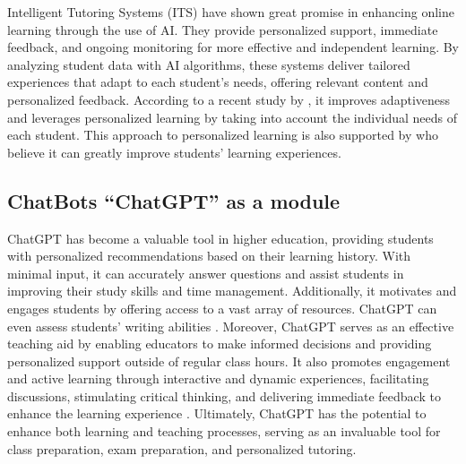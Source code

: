 Intelligent Tutoring Systems (ITS) have shown great promise in enhancing online learning 
through the use of AI. They provide personalized support, immediate feedback, and ongoing
monitoring for more effective and independent learning. By analyzing student data with
AI algorithms, these systems deliver tailored experiences that adapt to each student's needs,
offering relevant content and personalized feedback.
According to a recent study by \citep{l_d_of_cs_akshara_first_grade_college_2023}, it  improves 
adaptiveness and leverages personalized learning by taking into account the individual needs of each student. 
This approach to personalized learning is also supported by \citep{bradac_design_2022} who believe it can greatly 
improve students' learning experiences.

\subsection{ChatBots ``ChatGPT'' as a module}

ChatGPT has become a valuable tool in higher education, providing students with personalized 
recommendations based on their learning history. With minimal input, it can accurately answer 
questions and assist students in improving their study skills and time management. Additionally, 
it motivates and engages students by offering access to a vast array of resources. ChatGPT can even 
assess students' writing abilities \citep{mohammed_exploring_2023}. 
Moreover, ChatGPT serves as an effective teaching aid by enabling educators to make informed decisions 
and providing personalized support outside of regular class hours. It also promotes engagement and active 
learning through interactive and dynamic experiences, facilitating discussions, stimulating critical thinking, 
and delivering immediate feedback to enhance the learning experience \citep{schonberger_chatgpt_2023}. 
Ultimately, ChatGPT has the potential to enhance both learning and teaching processes, serving as an invaluable 
tool for class preparation, exam preparation, and personalized tutoring\citep{domenech_chatgpt_2023}. 

